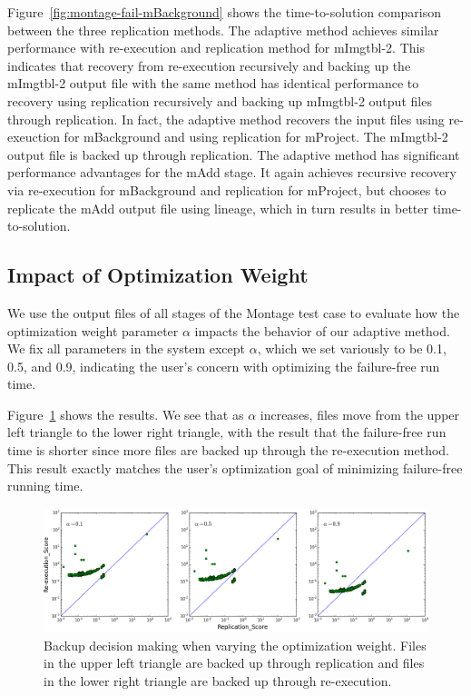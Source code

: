 \documentclass{sig-alternate}
\newcommand{\katznote}[1]{ {\textcolor{blue}    { ***Dan:      #1 }}}
\newcommand{\kylenote}[1]{{\textcolor{orange}    { ***Kyle:      #1 }}}
\newcommand{\katznote}[1]{}
\newcommand{\kylenote}[1]{}
\begin{document}
Figure~\ref{fig:montage-fail-mBackground} shows the time-to-solution comparison between the three replication methods. 
The adaptive method achieves similar performance with re-execution and replication method for mImgtbl-2. 
This indicates that recovery from re-execution recursively and backing up the mImgtbl-2 output file with the same method has identical performance to recovery using replication recursively and backing up mImgtbl-2 output files through replication. 
In fact, the adaptive method recovers the input files using re-exeuction for mBackground and using replication for mProject. The mImgtbl-2 output file is backed up through replication.
The adaptive method has significant performance advantages for the mAdd stage.
It again achieves recursive recovery via re-execution for mBackground and replication for mProject,
but chooses to replicate the mAdd output file using lineage, which in turn results in better time-to-solution.



\subsection{Impact of Optimization Weight}
\label{sec:Perf:Weight}
We use the output files of all stages of the Montage test case to evaluate how the optimization weight parameter $\alpha$ impacts the behavior of our adaptive method. %
We fix all parameters in the system except $\alpha$, which we set variously to be 0.1, 0.5, and 0.9, indicating the user's concern with optimizing the failure-free run time.


Figure~\ref{fig:weight} shows the results. We see that as $\alpha$ increases, files move from the upper left triangle to the lower right triangle, with the result that the failure-free run time is shorter since more files are backed up through the re-execution method.
This result exactly matches the user's optimization goal of minimizing failure-free running time.

\begin{figure}[ht]
	\begin{center}
		\includegraphics[width=160mm]{pictures/weight}
		\vspace{-10pt}
		\caption{Backup decision making when varying the optimization weight. Files in the upper left triangle are backed up through replication and files in the lower right triangle are backed up through re-execution.
		\label{fig:weight}}
  	\end{center}
\end{figure}
\end{document}

